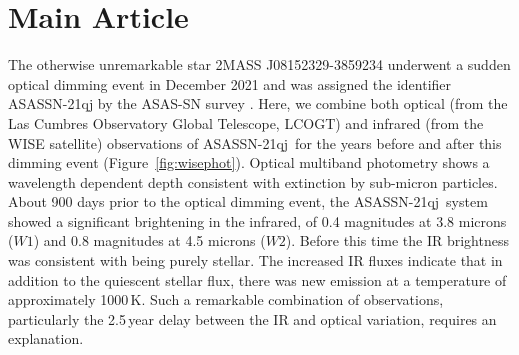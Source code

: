 \documentclass[sn-nature]{sn-jnl}%
\newcommand{\asas}{ASASSN-21qj}
\begin{document}

\maketitle





\section{Main Article}\label{sec1}






The otherwise unremarkable star 2MASS J08152329-3859234 underwent a sudden optical dimming event in December 2021 \cite{RizzoSmith21,RizzoSmith22} and was assigned the identifier \asas{} by the ASAS-SN survey \citep{shappee_man_2014,kochanek_all-sky_2017}.
%
Here, we combine both optical (from the Las Cumbres Observatory Global Telescope, LCOGT) and infrared (from the WISE satellite) observations of \asas~for the years before and after this dimming event (Figure~\ref{fig:wisephot}). 
%
Optical multiband photometry shows a wavelength dependent depth consistent with extinction by sub-micron particles.
%
About 900 days prior to the optical dimming event, the \asas~system showed a significant brightening in the infrared, of 0.4 magnitudes at 3.8 microns ($W1$) and 0.8 magnitudes at 4.5 microns ($W2$).
%
Before this time the IR brightness was consistent with being purely stellar.
%
The increased IR fluxes indicate that in addition to the quiescent stellar flux, there was new emission at a temperature of approximately 1000\,K.
%
Such a remarkable combination of observations, particularly the 2.5\,year delay between the IR and optical variation, requires an explanation.
\end{document}
